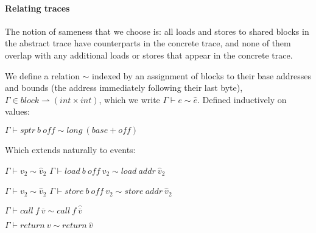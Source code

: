 \documentclass{article}
\begin{document}
\paragraph{Relating traces}

The notion of sameness that we choose is: all loads and stores to shared blocks in the abstract
trace have counterparts in the concrete trace, and none of them overlap with any additional
loads or stores that appear in the concrete trace.

We define a relation \(\sim\) indexed by an assignment of blocks to their base addresses and bounds
(the address immediately following their last byte),
\(\Gamma \in \mathit{block} \rightharpoonup (\mathit{int} \times \mathit{int})\), which we write
\(\Gamma \vdash e \sim \hat{e}\). Defined inductively on values:

\begin{minipage}{0.38\textwidth}
           {\(\Gamma \vdash \mathit{sptr} ~ b ~ \mathit{off} \sim \mathit{long} ~ (\mathit{base}+\mathit{off})\)}
\end{minipage}
\begin{minipage}{0.38\textwidth}
\end{minipage}
\begin{minipage}{0.23\textwidth}
\end{minipage}

Which extends naturally to events:

\begin{minipage}{0.45\textwidth}
              {\(\Gamma \vdash v_2 \sim \hat{v}_2\)}
              {\(\Gamma \vdash \mathit{load} ~ b ~ \mathit{off} ~ v_2 \sim
                \mathit{load} ~ \mathit{addr} ~ \hat{v}_2\)}
\end{minipage}
\begin{minipage}{0.45\textwidth}
              {\(\Gamma \vdash v_2 \sim \hat{v}_2\)}
              {\(\Gamma \vdash \mathit{store} ~ b ~ \mathit{off} ~ v_2 \sim
                \mathit{store} ~ \mathit{addr} ~ \hat{v}_2\)}
\end{minipage}

\begin{minipage}{0.45\textwidth}
           {\(\Gamma \vdash \mathit{call} ~ f ~ \overline{v} \sim \mathit{call} ~ f ~ \hat{\overline{v}}\)}
\end{minipage}
\begin{minipage}{0.45\textwidth}
           {\(\Gamma \vdash \mathit{return} ~ v \sim \mathit{return} ~ \hat{v}\)}
\end{minipage}
\end{document}
